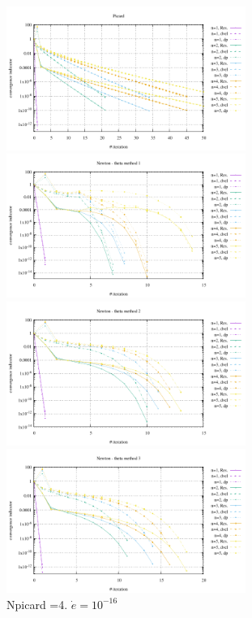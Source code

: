 \begin{center}
\includegraphics[width=7.8cm]{python_codes/fieldstone_87/results/experiment_07/conv_picard.pdf}
\includegraphics[width=7.8cm]{python_codes/fieldstone_87/results/experiment_07/conv_meth1.pdf}\\
\includegraphics[width=7.8cm]{python_codes/fieldstone_87/results/experiment_07/conv_meth2.pdf}
\includegraphics[width=7.8cm]{python_codes/fieldstone_87/results/experiment_07/conv_meth3.pdf}\\
{\captionfont Npicard =4. $\dot{e}=10^{-16}$}
\end{center}

